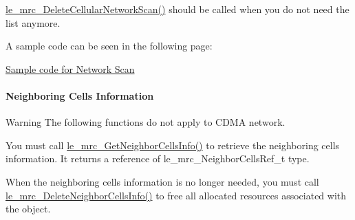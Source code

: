 \hyperlink{le__mrc__interface_8h_ac45ce335b3fa063b83bb925e67eeaeb3}{le\+\_\+mrc\+\_\+\+Delete\+Cellular\+Network\+Scan()} should be called when you do not need the list anymore.

A sample code can be seen in the following page\+:
\begin{DoxyItemize}
\item \hyperlink{c_mrcNetworkScan}{Sample code for Network Scan}
\end{DoxyItemize}\hypertarget{c_mrc_le_mrc_ngbr}{}\paragraph{Neighboring Cells Information}\label{c_mrc_le_mrc_ngbr}
\begin{DoxyWarning}{Warning}
The following functions do not apply to C\+D\+MA network.
\end{DoxyWarning}
You must call \hyperlink{le__mrc__interface_8h_a8d44fe46e61f3399c5e0dd6002b042ae}{le\+\_\+mrc\+\_\+\+Get\+Neighbor\+Cells\+Info()} to retrieve the neighboring cells information. It returns a reference of le\+\_\+mrc\+\_\+\+Neighbor\+Cells\+Ref\+\_\+t type.

When the neighboring cells information is no longer needed, you must call \hyperlink{le__mrc__interface_8h_a101343359e8d36ab41180aede2891b07}{le\+\_\+mrc\+\_\+\+Delete\+Neighbor\+Cells\+Info()} to free all allocated resources associated with the object.

